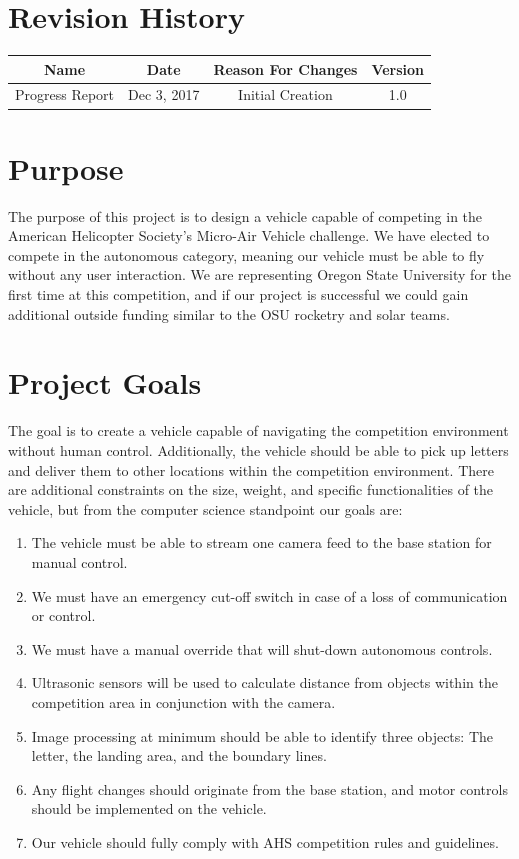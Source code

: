 \documentclass[onecolumn, draftclsnofoot,10pt, compsoc]{IEEEtran}
\begin{document}
\section*{Revision History}

\begin{center}
    \begin{tabular}{|c|c|c|c|}
        \hline
		Name & Date & Reason For Changes & Version\\
        \hline
		Progress Report & Dec 3, 2017 & Initial Creation & 1.0\\
		\hline 
    \end{tabular}
\end{center}




\section{Purpose}

The purpose of this project is to design a vehicle capable of competing in the American Helicopter Society’s Micro-Air Vehicle challenge. We have elected to compete in the autonomous category, meaning our vehicle must be able to fly without any user interaction. We are representing Oregon State University for the first time at this competition, and if our project is successful we could gain additional outside funding similar to the OSU rocketry and solar teams.

\section{Project Goals}
The goal is to create a vehicle capable of navigating the competition environment without human control. Additionally, the vehicle should be able to pick up letters and deliver them to other locations within the competition environment. There are additional constraints on the size, weight, and specific functionalities of the vehicle, but from the computer science standpoint our goals are:

\begin{enumerate}
\item{The vehicle must be able to stream one camera feed to the base station for manual control. }
\item{We must have an emergency cut-off switch in case of a loss of communication or control. }
\item{We must have a manual override that will shut-down autonomous controls.}
\item{Ultrasonic sensors will be used to calculate distance from objects within the competition area in conjunction with the camera.}
\item{Image processing at minimum should be able to identify three objects: The letter, the landing area, and the boundary lines.}
\item{Any flight changes should originate from the base station, and motor controls should be implemented on the vehicle.}
\item{Our vehicle should fully comply with AHS competition rules and guidelines. }
\end{enumerate}
\end{document}
